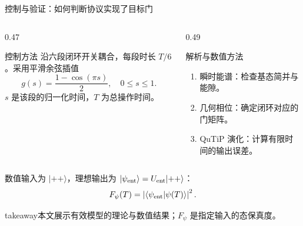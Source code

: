 \documentclass[aspectratio=169,11pt]{beamer}
\newcommand{\takeaway}[1]{%
  \begin{beamercolorbox}[wd=\linewidth,sep=0.6em]{takeaway}\small #1\end{beamercolorbox}}
\newcommand{\ket}[1]{\lvert #1\rangle}
\newcommand{\bra}[1]{\langle #1\rvert}
\newcommand{\Uent}{U_{\mathrm{ent}}}
\begin{document}
\begin{frame}[t,shrink=2]{控制与验证：如何判断协议实现了目标门}
  \begin{columns}[T,onlytextwidth]
    \begin{column}{0.47\textwidth}
      \begin{block}{控制方法}
        \small
        沿六段闭环开关耦合，每段时长 $T/6$。采用平滑余弦插值
        \[
          g(s)=\frac{1-\cos(\pi s)}{2},\quad 0\le s\le1.
        \]
        $s$ 是该段的归一化时间，$T$ 为总操作时间。
      \end{block}
    \end{column}
    \begin{column}{0.49\textwidth}
      \begin{block}{解析与数值方法}
        \small
        \begin{enumerate}\setlength{\itemsep}{0.1cm}
          \item 瞬时能谱：检查基态简并与能隙。
          \item 几何相位：确定闭环对应的门矩阵。
          \item QuTiP 演化：计算有限时间的输出误差。
        \end{enumerate}
      \end{block}
    \end{column}
  \end{columns}
  \vspace{0.1cm}
  \small
  数值输入为 $\ket{++}$，理想输出为 $\ket{\psi_{\rm ent}}=\Uent\ket{++}$：
  \[
    F_\psi(T)=\left|\bra{\psi_{\rm ent}}\psi(T)\rangle\right|^2.
  \]
  \takeaway{本文展示有效模型的理论与数值结果；$F_\psi$ 是指定输入的态保真度。}
\end{frame}
\end{document}
